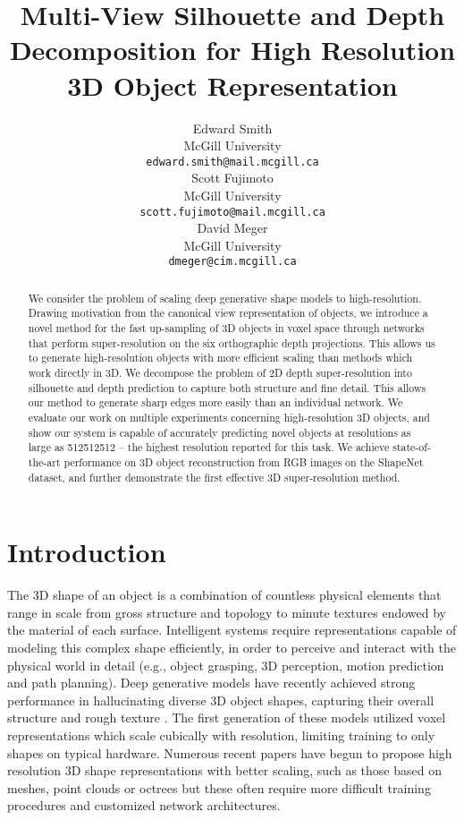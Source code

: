 \documentclass{article}
\title{Multi-View Silhouette and Depth Decomposition for High Resolution 3D Object Representation}
\author{
	Edward Smith \\
    McGill University \\
    \texttt{edward.smith@mail.mcgill.ca} \\
    \And
    Scott Fujimoto \\
    McGill University \\
    \texttt{scott.fujimoto@mail.mcgill.ca} \\
    \And
    David Meger \\
    McGill University \\
    \texttt{dmeger@cim.mcgill.ca} \\
}
\begin{document}
\maketitle

\begin{abstract}
We consider the problem of scaling deep generative shape models to high-resolution. Drawing motivation from the canonical view representation of objects, we introduce a novel method for the fast up-sampling of 3D objects in voxel space through networks that perform super-resolution on the six orthographic depth projections. This allows us to generate high-resolution objects with more efficient scaling than methods which work directly in 3D. We decompose the problem of 2D depth super-resolution into silhouette and depth prediction to capture both structure and fine detail. This allows our method to generate sharp edges more easily than an individual network. We evaluate our work on multiple experiments concerning high-resolution 3D objects, and show our system is capable of accurately predicting novel objects at resolutions as large as 512512512 -- the highest resolution reported for this task. We achieve state-of-the-art performance on 3D object reconstruction from RGB images on the ShapeNet dataset, and further demonstrate the first effective 3D super-resolution method. 
\end{abstract}

\section{Introduction}
The 3D shape of an object is a combination of countless physical elements that range in scale from gross structure and topology to minute textures endowed by the material of each surface. Intelligent systems require representations capable of modeling this complex shape efficiently, in order to perceive and interact with the physical world in detail (e.g., object grasping, 3D perception, motion prediction and path planning). Deep generative models have recently achieved strong performance in hallucinating diverse 3D object shapes, capturing their overall structure and rough texture \cite{choy20163d,sharma2016vconv,3DGAN}. The first generation of these models utilized voxel representations which scale cubically with resolution, limiting training to only  shapes on typical hardware. Numerous recent papers have begun to propose high resolution 3D shape representations with better scaling, such as those based on meshes, point clouds or octrees but these often require more difficult training procedures and customized network architectures. 
\end{document}
